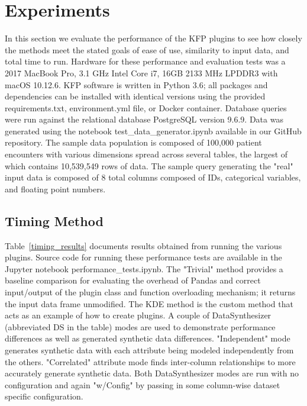 \documentclass{amia}
\begin{document}
\section{Experiments}

In this section we evaluate the performance of the KFP plugins to see how closely the methods meet the stated goals of ease of use, similarity to input data, and total time to run. Hardware for these performance and evaluation tests was a 2017 MacBook Pro, 3.1 GHz Intel Core i7, 16GB 2133 MHz LPDDR3 with macOS 10.12.6. KFP software is written in Python 3.6; all packages and dependencies can be installed with identical versions using the provided requirements.txt, environment.yml file, or Docker container. Database queries were run against the relational database PostgreSQL version 9.6.9. Data was generated using the notebook test\_data\_generator.ipynb available in our GitHub repository. The sample data population is composed of 100,000 patient encounters with various dimensions spread across several tables, the largest of which contains 10,539,549 rows of data. The sample query generating the "real" input data is composed of 8 total columns composed of IDs, categorical variables, and floating point numbers.

\subsection{Timing Method}

Table~\ref{timing_results} documents results obtained from running the various plugins. Source code for running these performance tests are available in the Jupyter notebook performance\_tests.ipynb. The "Trivial" method provides a baseline comparison for evaluating the overhead of Pandas and correct input/output of the plugin class and function overloading mechanism; it returns the input data frame unmodified. The KDE method is the custom method that acts as an example of how to create plugins. A couple of DataSynthesizer (abbreviated DS in the table) modes are used to demonstrate performance differences as well as generated synthetic data differences. "Independent" mode generates synthetic data with each attribute being modeled independently from the others. "Correlated" attribute mode finds inter-column relationships to more accurately generate synthetic data. Both DataSynthesizer modes are run with no configuration and again "w/Config" by passing in some column-wise dataset specific configuration.
\end{document}
